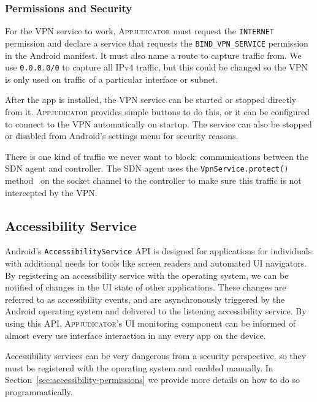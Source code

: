 \subsubsection{Permissions and Security}
\label{sec:vpn-permissions}

For the VPN service to work, \textsc{Appjudicator} must request the
\texttt{INTERNET} permission and declare a service that requests the
\texttt{BIND\_VPN\_SERVICE} permission in the Android manifest. It must also
name a route to capture traffic from. We use \texttt{0.0.0.0/0} to capture all
IPv4 traffic, but this could be changed so the VPN is only used on traffic of a
particular interface or subnet.

After the app is installed, the VPN service can be started or stopped directly
from it. \textsc{Appjudicator} provides simple buttons to do this, or it can be
configured to connect to the VPN automatically on startup. The service can also
be stopped or disabled from Android's settings menu for security reasons.

There is one kind of traffic we never want to block: communications between the
SDN agent and controller. The SDN agent uses the \texttt{VpnService.protect()}
method~\cite{googledevelopers2020vpn} on the socket channel to the controller to
make sure this traffic is not intercepted by the VPN.


\subsection{Accessibility Service}
\label{sec:implementation-accessibility-service}

Android's \texttt{AccessibilityService} API is designed for applications for
individuals with additional needs for tools like screen readers and automated UI
navigators. By registering an accessibility service with the operating system,
we can be notified of changes in the UI state of other applications. These
changes are referred to as accessibility events, and are asynchronously
triggered by the Android operating system and delivered to the listening
accessibility service. By using this API, \textsc{Appjudicator}'s UI monitoring
component can be informed of almost every use interface interaction in any every
app on the device.

Accessibility services can be very dangerous from a security perspective, so they
must be registered with the operating system and enabled manually. In
Section~\ref{sec:accessibility-permissions} we provide more details on how to do
so programmatically.

